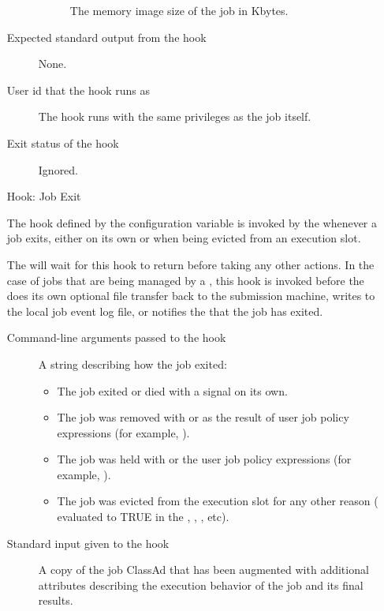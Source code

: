 \begin{itemize}
\begin{description}
\begin{description}
\item[]
  The memory image size of the job in Kbytes.
\end{description}

\item[Expected standard output from the hook]
  None.

\item[User id that the hook runs as]
  The  hook runs with the same
privileges as the job itself.

\item[Exit status of the hook]
  Ignored.
\end{description}


\item[Hook:  Job Exit]

The hook defined by the configuration variable
 is invoked by the 
whenever a job exits, either on its
own or when being evicted from an execution slot.

The  will wait for this hook to return before
taking any other actions.
In the case of jobs that are being managed by a , this
hook is invoked before the  does its own optional file
transfer back to the submission machine, writes to the local job event log
file, or notifies the  that the job has exited.

\begin{description}
\item[Command-line arguments passed to the hook]
  A string describing how the job exited:
  \begin{itemize}
    \item \verb@exit@ The job exited or died with a signal on its own.
    \item \verb@remove@ The job was removed with  or as the result of
    user job policy expressions (for example, ).
    \item \verb@hold@ The job was held with  or the
    user job policy expressions (for example, ).
    \item \verb@evict@ The job was evicted from the execution slot for
    any other reason ( evaluated to TRUE in the
    , , , etc).
  \end{itemize}

\item[Standard input given to the hook]
  A copy of the job ClassAd that has been augmented with additional
  attributes describing the execution behavior of the job and its
  final results.


\end{description}
\end{itemize}
